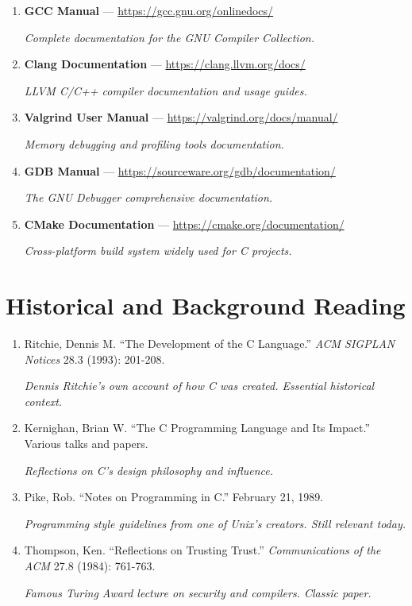 \documentclass[11pt,openany]{book}
\begin{document}
\begin{enumerate}
    \item \textbf{GCC Manual} — \url{https://gcc.gnu.org/onlinedocs/}

    \textit{Complete documentation for the GNU Compiler Collection.}

    \item \textbf{Clang Documentation} — \url{https://clang.llvm.org/docs/}

    \textit{LLVM C/C++ compiler documentation and usage guides.}

    \item \textbf{Valgrind User Manual} — \url{https://valgrind.org/docs/manual/}

    \textit{Memory debugging and profiling tools documentation.}

    \item \textbf{GDB Manual} — \url{https://sourceware.org/gdb/documentation/}

    \textit{The GNU Debugger comprehensive documentation.}

    \item \textbf{CMake Documentation} — \url{https://cmake.org/documentation/}

    \textit{Cross-platform build system widely used for C projects.}
\end{enumerate}

\section*{Historical and Background Reading}

\begin{enumerate}
    \item Ritchie, Dennis M. ``The Development of the C Language.'' \textit{ACM SIGPLAN Notices} 28.3 (1993): 201-208.

    \textit{Dennis Ritchie's own account of how C was created. Essential historical context.}

    \item Kernighan, Brian W. ``The C Programming Language and Its Impact.'' Various talks and papers.

    \textit{Reflections on C's design philosophy and influence.}

    \item Pike, Rob. ``Notes on Programming in C.'' February 21, 1989.

    \textit{Programming style guidelines from one of Unix's creators. Still relevant today.}

    \item Thompson, Ken. ``Reflections on Trusting Trust.'' \textit{Communications of the ACM} 27.8 (1984): 761-763.

    \textit{Famous Turing Award lecture on security and compilers. Classic paper.}
\end{enumerate}
\end{document}
